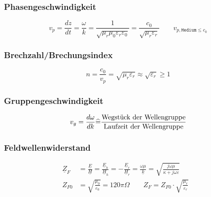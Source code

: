 \subsubsection{Phasengeschwindigkeit}
\[
v_p = \dfrac{d z}{d t} = \dfrac{\omega}{k} = \frac{1}{\sqrt{ \mu_r \mu_0 \varepsilon_r \varepsilon_0} } = \frac{c_0}{\sqrt{\mu_r \varepsilon_r}} \qquad v_{p,\texttt{Medium} \leq c_0}
\]

\subsubsection{Brechzahl/Brechungsindex}
\[ 
n = \frac{c_0}{v_p} = \sqrt{\mu_r \varepsilon_r} \approx \sqrt{\varepsilon_r} \geq 1
 \]
\subsubsection{Gruppengeschwindigkeit}
\[
v_g = \dfrac{d \omega}{d k} \widehat{=} \dfrac{\textnormal{Wegstück der Wellengruppe}}{\textnormal{Laufzeit der Wellengruppe}}
\]

\subsubsection{Feldwellenwiderstand}
\begin{align*}
	\underline{Z}_F &= \frac{\underline{E}}{\underline{H}} = \frac{\underline{E}_h}{\underline{H}_h} = -\frac{\underline{E}_r}{\underline{H}_r} = \frac{\omega \mu}{\underline{k}} = \sqrt{\frac{j\omega\mu}{\kappa+j \omega \varepsilon}}\\
	Z_{F0} &= \sqrt{\frac{\mu_0}{\varepsilon_0}} = 120\pi \Omega \qquad  Z_F = Z_{F0} \cdot \sqrt{\frac{\mu_r}{\varepsilon_r}} &
\end{align*}
